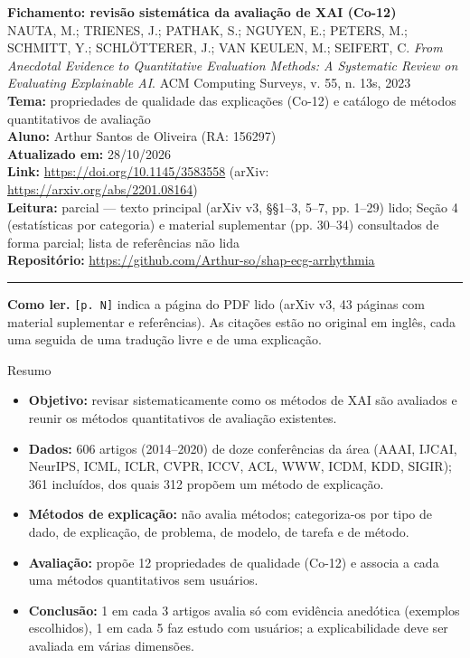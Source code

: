 \documentclass[11pt,a4paper]{article}
\begin{document}
\begin{center}
    {\LARGE \textbf{Fichamento: revisão sistemática da avaliação de XAI (Co-12)}} \\[0.35em]
    {\large NAUTA, M.; TRIENES, J.; PATHAK, S.; NGUYEN, E.; PETERS, M.; SCHMITT, Y.; SCHLÖTTERER, J.; VAN KEULEN, M.; SEIFERT, C. \textit{From Anecdotal Evidence to Quantitative Evaluation Methods: A Systematic Review on Evaluating Explainable AI}. ACM Computing Surveys, v. 55, n. 13s, 2023} \\[0.3em]
    \textbf{Tema:} propriedades de qualidade das explicações (Co-12) e catálogo de métodos quantitativos de avaliação \\[0.2em]
    \textbf{Aluno:} Arthur Santos de Oliveira (RA: 156297) \\[0.2em]
    \textbf{Atualizado em:} 28/10/2026 \\[0.2em]
    \textbf{Link:} \url{https://doi.org/10.1145/3583558} (arXiv: \url{https://arxiv.org/abs/2201.08164}) \\[0.2em]
    \textbf{Leitura:} parcial --- texto principal (arXiv v3, §§1--3, 5--7, pp. 1--29) lido; Seção 4 (estatísticas por categoria) e material suplementar (pp. 30--34) consultados de forma parcial; lista de referências não lida \\[0.2em]
    \textbf{Repositório:} \url{https://github.com/Arthur-so/shap-ecg-arrhythmia}
\end{center}
\vspace{-0.5em}
\hrule
\vspace{0.8em}

\textbf{Como ler.} \texttt{[p. N]} indica a página do PDF lido (arXiv v3, 43 páginas com material suplementar e referências). As citações estão no original em inglês, cada uma seguida de uma tradução livre e de uma explicação.

\begin{infobox}[note]{Resumo}
\begin{itemize}
  \item \textbf{Objetivo:} revisar sistematicamente como os métodos de XAI são avaliados e reunir os métodos quantitativos de avaliação existentes.
  \item \textbf{Dados:} 606 artigos (2014--2020) de doze conferências da área (AAAI, IJCAI, NeurIPS, ICML, ICLR, CVPR, ICCV, ACL, WWW, ICDM, KDD, SIGIR); 361 incluídos, dos quais 312 propõem um método de explicação.
  \item \textbf{Métodos de explicação:} não avalia métodos; categoriza-os por tipo de dado, de explicação, de problema, de modelo, de tarefa e de método.
  \item \textbf{Avaliação:} propõe 12 propriedades de qualidade (Co-12) e associa a cada uma métodos quantitativos sem usuários.
  \item \textbf{Conclusão:} 1 em cada 3 artigos avalia só com evidência anedótica (exemplos escolhidos), 1 em cada 5 faz estudo com usuários; a explicabilidade deve ser avaliada em várias dimensões.
\end{itemize}
\end{infobox}
\end{document}
